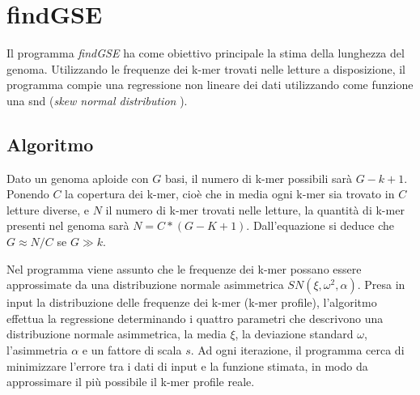 \documentclass[crop=false, class=book]{standalone}
\begin{document}
	\chapter{findGSE}
	
	Il programma \textit{findGSE} \cite{sun2017findGSE} ha come obiettivo principale la stima della lunghezza del genoma. Utilizzando le frequenze dei k-mer trovati nelle letture a disposizione, il programma compie una regressione non lineare dei dati utilizzando come funzione una \gls{snd} (\textit{skew normal distribution} \cite{azzalini1985class,azzalini2005skew}).
	
	
	\section{Algoritmo}
	Dato un genoma aploide con $G$ basi, il numero di k-mer possibili sarà $G-k+1$. Ponendo $C$ la copertura dei k-mer, cioè che in media ogni k-mer sia trovato in $C$ letture diverse, e $N$ il numero di k-mer trovati nelle letture, la quantità di k-mer presenti nel genoma sarà $N=C*(G-K+1)$. Dall'equazione si deduce che $G\approx N/C$ se $G\gg k$.
	
	Nel programma viene assunto che le frequenze dei k-mer possano essere approssimate da una distribuzione normale asimmetrica $SN(\xi, \omega^2, \alpha)$. Presa in input la distribuzione delle frequenze dei k-mer (k-mer profile), l'algoritmo effettua la regressione determinando i quattro parametri che descrivono una distribuzione normale asimmetrica, la media $\xi$, la deviazione standard $\omega$, l'asimmetria $\alpha$ e un fattore di scala $s$. Ad ogni iterazione, il programma cerca di minimizzare l'errore tra i dati di input e la funzione stimata, in modo da approssimare il più possibile il k-mer profile reale.
	
\end{document}
